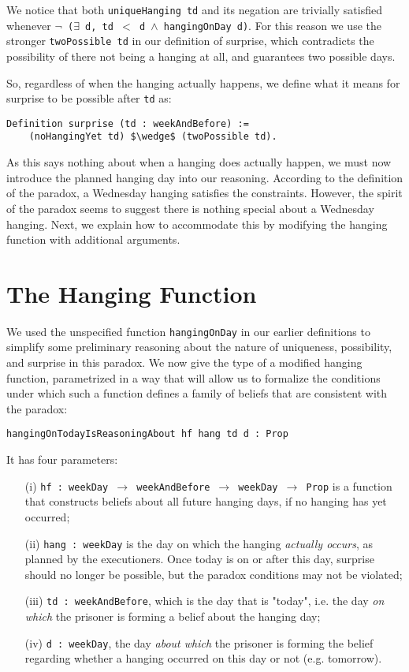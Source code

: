 \documentclass[runningheads]{llncs}
\begin{document}
We notice that both {\tt uniqueHanging td} and its negation are trivially
satisfied whenever {\tt $\neg$ ($\exists$ d, td $<$ d $\wedge$ hangingOnDay d)}. For this
reason we use the stronger {\tt twoPossible td} in our definition of surprise,
which contradicts the possibility of there not being a hanging at all, and
guarantees two possible days.

So, regardless of when the hanging actually happens, we define what it means
for surprise to be possible after {\tt td} as:

\begin{lstlisting}[mathescape=true]
  Definition surprise (td : weekAndBefore) :=
    (noHangingYet td) $\wedge$ (twoPossible td).
\end{lstlisting}

As this says nothing about when a hanging does actually happen, we must now introduce
the planned hanging day into our reasoning.
According to the definition of the paradox, a Wednesday hanging satisfies
the constraints. However, the spirit of the paradox seems to suggest there is nothing
special about a Wednesday hanging. Next, we explain how to accommodate this by
modifying the hanging function with additional arguments.

\section{The Hanging Function}
\label{sec:hang-func}

We used the unspecified function {\tt hangingOnDay} in our earlier definitions to simplify
some preliminary reasoning about the nature of uniqueness, possibility, and
surprise in this paradox.
We now give the type of a modified hanging function, parametrized in a way that will
allow us to formalize the conditions under which such a function defines a family
of beliefs that are consistent with the paradox:
\newline

{\tt hangingOnTodayIsReasoningAbout hf hang td d : Prop} \newline

It has four parameters:

\begin{itemize}
  \item[(i)] {\tt hf  : weekDay $\to$ weekAndBefore $\to$ weekDay $\to$ Prop} is
  a function that constructs beliefs about all future hanging days, if no
  hanging has yet occurred;
  \item[(ii)] {\tt hang : weekDay} is the day on which the hanging \emph{actually occurs},
  as planned by the executioners.
  Once today is on or after this day, surprise should no longer be possible, but the paradox
  conditions may not be violated;
  \item[(iii)] {\tt td : weekAndBefore}, which is the day that is "today", i.e. the day
  \emph{on which} the prisoner is forming a belief about the hanging day;
  \item[(iv)] {\tt d : weekDay}, the day \emph{about which} the prisoner is forming the belief
  regarding whether a hanging occurred on this day or not (e.g. tomorrow).
\end{itemize}
\end{document}

